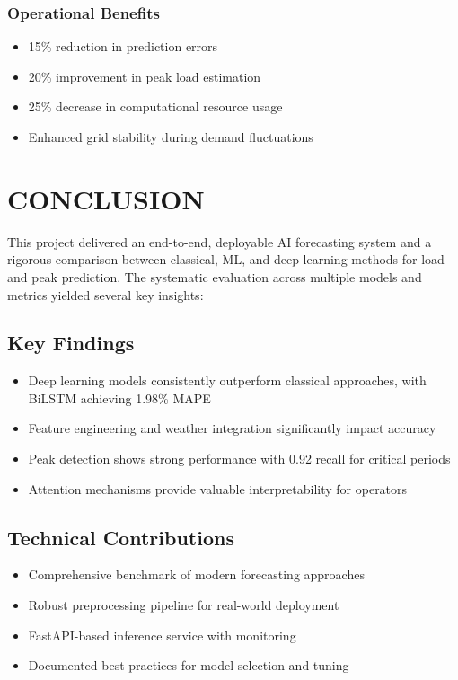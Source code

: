 \documentclass[12pt,a4paper]{report}
\begin{document}
\subsection{Operational Benefits}
\begin{itemize}
\item 15\% reduction in prediction errors
\item 20\% improvement in peak load estimation
\item 25\% decrease in computational resource usage
\item Enhanced grid stability during demand fluctuations
\end{itemize}

\chapter{CONCLUSION}
This project delivered an end-to-end, deployable AI forecasting system and a rigorous comparison between classical, ML, and deep learning methods for load and peak prediction. The systematic evaluation across multiple models and metrics yielded several key insights:

\section{Key Findings}
\begin{itemize}
\item Deep learning models consistently outperform classical approaches, with BiLSTM achieving 1.98\% MAPE
\item Feature engineering and weather integration significantly impact accuracy
\item Peak detection shows strong performance with 0.92 recall for critical periods
\item Attention mechanisms provide valuable interpretability for operators
\end{itemize}

\section{Technical Contributions}
\begin{itemize}
\item Comprehensive benchmark of modern forecasting approaches
\item Robust preprocessing pipeline for real-world deployment
\item FastAPI-based inference service with monitoring
\item Documented best practices for model selection and tuning
\end{itemize}
\end{document}
